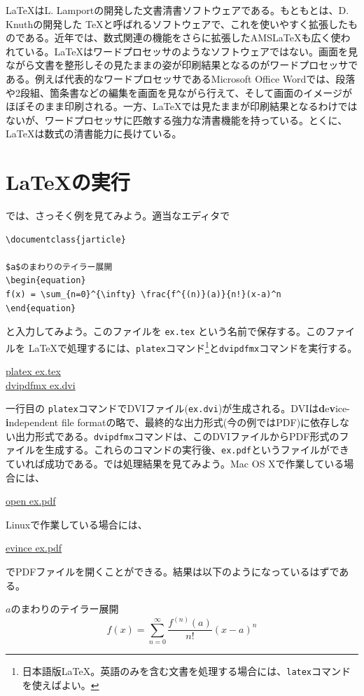 \LaTeX はL. Lamportの開発した文書清書ソフトウェアである。もともとは、D. Knuthの開発した \TeX と呼ばれるソフトウェアで、これを使いやすく拡張したものである。近年では、数式関連の機能をさらに拡張したAMS\LaTeX も広く使われている。\LaTeX はワードプロセッサのようなソフトウェアではない。画面を見ながら文書を整形しその見たままの姿が印刷結果となるのがワードプロセッサである。例えば代表的なワードプロセッサであるMicrosoft Office Wordでは、段落や2段組、箇条書などの編集を画面を見ながら行えて、そして画面のイメージがほぼそのまま印刷される。一方、\LaTeX では見たままが印刷結果となるわけではないが、ワードプロセッサに匹敵する強力な清書機能を持っている。とくに、\LaTeX は数式の清書能力に長けている。

\section{\LaTeX の実行}
\label{sec:latex:intro}

では、さっそく例を見てみよう。適当なエディタで
\begin{reidai}
\label{reidai:latex:ex}
\begin{verbatim}
\documentclass{jarticle}

$a$のまわりのテイラー展開
\begin{equation}
f(x) = \sum_{n=0}^{\infty} \frac{f^{(n)}(a)}{n!}(x-a)^n
\end{equation}

\end{verbatim}
\end{reidai} \noindent
と入力してみよう。このファイルを \texttt{ex.tex} という名前で保存する。このファイルを \LaTeX で処理するには、\texttt{platex}コマンド\footnote{日本語版\LaTeX 。英語のみを含む文書を処理する場合には、\texttt{latex}コマンドを使えばよい。}と\texttt{dvipdfmx}コマンドを実行する。
\begin{commandline2}
\prompt \underline{platex ex.tex}\\
\prompt \underline{dvipdfmx ex.dvi}
\end{commandline2} \noindent
一行目の \texttt{platex}コマンドでDVIファイル(\texttt{ex.dvi})が生成される。DVIは{\textbf{d}e\textbf{v}ice-\textbf{i}ndependent file format}の略で、最終的な出力形式(今の例ではPDF)に依存しない出力形式である。\texttt{dvipdfmx}コマンドは、このDVIファイルからPDF形式のファイルを生成する。これらのコマンドの実行後、\texttt{ex.pdf}というファイルができていれば成功である。では処理結果を見てみよう。Mac OS Xで作業している場合には、
\begin{commandline2}
\prompt \underline{open ex.pdf}
\end{commandline2} \noindent
Linuxで作業している場合には、
\begin{commandline2}
\prompt \underline{evince ex.pdf}
\end{commandline2} \noindent
でPDFファイルを開くことができる。結果は以下のようになっているはずである。
\renewcommand{\theequation}{1}
\begin{kekka}
\label{kekka:ex}
$a$のまわりのテイラー展開
\begin{equation}
 f(x) = \sum_{n=0}^{\infty} \frac{f^{(n)}(a)}{n!}(x-a)^n
\end{equation}
\vspace{0pt}
\end{kekka}

